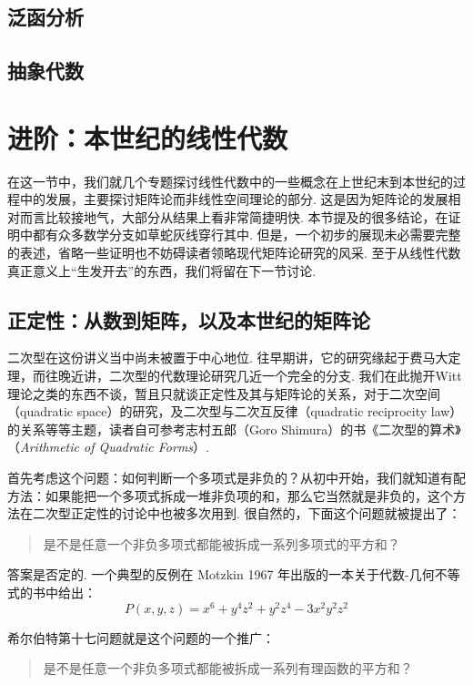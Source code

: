 \subsection{泛函分析}


\subsection{抽象代数}


\section{进阶：本世纪的线性代数}

在这一节中，我们就几个专题探讨线性代数中的一些概念在上世纪末到本世纪的过程中的发展，主要探讨矩阵论而非线性空间理论的部分. 这是因为矩阵论的发展相对而言比较接地气，大部分从结果上看非常简捷明快. 本节提及的很多结论，在证明中都有众多数学分支如草蛇灰线穿行其中. 但是，一个初步的展现未必需要完整的表述，省略一些证明也不妨碍读者领略现代矩阵论研究的风采. 至于从线性代数真正意义上“生发开去”的东西，我们将留在下一节讨论.

\subsection{正定性：从数到矩阵，以及本世纪的矩阵论}

二次型在这份讲义当中尚未被置于中心地位. 往早期讲，它的研究缘起于费马大定理，而往晚近讲，二次型的代数理论研究几近一个完全的分支. 我们在此抛开Witt理论之类的东西不谈，暂且只就谈正定性及其与矩阵论的关系，对于二次空间（quadratic space）的研究，及二次型与二次互反律（quadratic reciprocity law）的关系等等主题，读者自可参考志村五郎（Goro Shimura）的书《二次型的算术》（\textit{Arithmetic of Quadratic Forms}）.

首先考虑这个问题：如何判断一个多项式是非负的？从初中开始，我们就知道有配方法：如果能把一个多项式拆成一堆非负项的和，那么它当然就是非负的，这个方法在二次型正定性的讨论中也被多次用到. 很自然的，下面这个问题就被提出了：

\begin{quote}
\kaishu
是不是任意一个非负多项式都能被拆成一系列多项式的平方和？
\end{quote}

答案是否定的. 一个典型的反例在 Motzkin 1967 年出版的一本关于代数-几何不等式的书中给出：
\[
P(x, y, z) = x^6 + y^4z^2 + y^2z^4 -3x^2y^2z^2
\]

希尔伯特第十七问题就是这个问题的一个推广：
\begin{quote}
\kaishu
是不是任意一个非负多项式都能被拆成一系列有理函数的平方和？
\end{quote}

